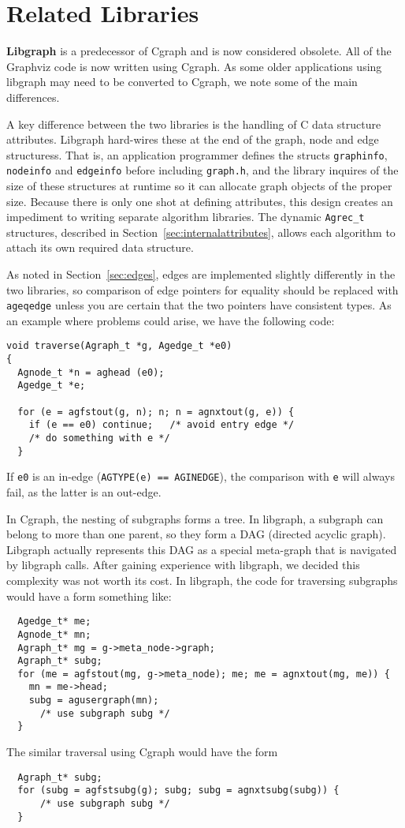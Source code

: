 \documentclass[11pt,letterpaper]{article}
\begin{document}
\section{Related Libraries}
\label{sec:relatedlibraries}
{\bf Libgraph} is a predecessor of Cgraph and is now considered
obsolete. All of the Graphviz code is now written using Cgraph.
As some older applications using libgraph
may need to be converted to Cgraph, we note some of the main
differences.

A key difference between the two libraries is the handling of
C data structure attributes.  Libgraph hard-wires these
at the end of the graph, node and edge structuress.  That is,
an application programmer defines the structs {\tt graphinfo}, {\tt nodeinfo}
and {\tt edgeinfo} before including {\tt graph.h}, and the library inquires of
the size of these structures at runtime so it can allocate graph
objects of the proper size.  Because there is only one shot at
defining attributes, this design creates an impediment to writing
separate algorithm libraries.
The dynamic \verb"Agrec_t" structures, described in Section~\ref{sec:internalattributes}, 
allows each algorithm to attach its own required data structure.

As noted in Section~\ref{sec:edges}, edges are implemented slightly
differently in the two libraries, so comparison of edge pointers for
equality should be replaced with \verb"ageqedge" unless you are certain
that the two pointers have consistent types. As an example where problems
could arise, we have the following code:
\begin{verbatim}
void traverse(Agraph_t *g, Agedge_t *e0)
{
  Agnode_t *n = aghead (e0);
  Agedge_t *e;
    
  for (e = agfstout(g, n); n; n = agnxtout(g, e)) {
    if (e == e0) continue;   /* avoid entry edge */
    /* do something with e */
  }
\end{verbatim}
If \verb"e0" is an in-edge (\verb"AGTYPE(e) == AGINEDGE"), the comparison
with \verb"e" will always fail, as the latter is an out-edge.

In Cgraph, the nesting of subgraphs forms a tree.
In libgraph, a subgraph can belong to more than one parent,
so they form a DAG (directed acyclic graph). Libgraph
actually represents this DAG as a special meta-graph
that is navigated by libgraph calls.  After gaining
experience with libgraph, we decided this complexity
was not worth its cost. In libgraph, the code for traversing
subgraphs would have a form something like\label{subg}:
\begin{verbatim}
  Agedge_t* me;
  Agnode_t* mn;
  Agraph_t* mg = g->meta_node->graph;
  Agraph_t* subg;
  for (me = agfstout(mg, g->meta_node); me; me = agnxtout(mg, me)) {
    mn = me->head;
    subg = agusergraph(mn);
      /* use subgraph subg */
  }
\end{verbatim}
The similar traversal using Cgraph would have the form
\begin{verbatim}
  Agraph_t* subg;
  for (subg = agfstsubg(g); subg; subg = agnxtsubg(subg)) {
      /* use subgraph subg */
  }
\end{verbatim}
\end{document}
